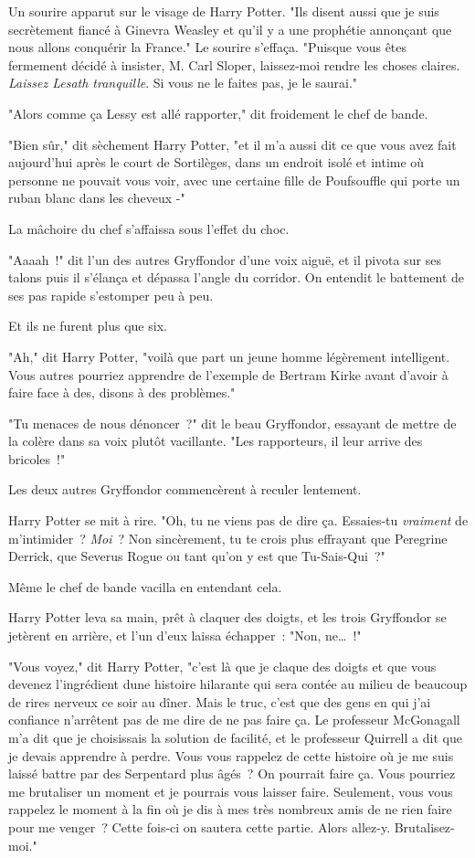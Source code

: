 Un sourire apparut sur le visage de Harry Potter. "Ils disent aussi que je suis secrètement fiancé à Ginevra Weasley et qu'il y a une prophétie annonçant que nous allons conquérir la France." Le sourire s'effaça. "Puisque vous êtes fermement décidé à insister, M. Carl Sloper, laissez-moi rendre les choses claires. \emph{Laissez Lesath tranquille}. Si vous ne le faites pas, je le saurai."

"Alors comme ça Lessy est allé rapporter," dit froidement le chef de bande.

"Bien sûr," dit sèchement Harry Potter, "et il m'a aussi dit ce que vous avez fait aujourd'hui après le court de Sortilèges, dans un endroit isolé et intime où personne ne pouvait vous voir, avec une certaine fille de Poufsouffle qui porte un ruban blanc dans les cheveux -"

La mâchoire du chef s'affaissa sous l'effet du choc.

"Aaaah~!" dit l'un des autres Gryffondor d'une voix aiguë, et il pivota sur ses talons puis il s'élança et dépassa l'angle du corridor. On entendit le battement de ses pas rapide s'estomper peu à peu.

Et ils ne furent plus que six.

"Ah," dit Harry Potter, "voilà que part un jeune homme légèrement intelligent. Vous autres pourriez apprendre de l'exemple de Bertram Kirke avant d'avoir à faire face à des, disons à des problèmes."

"Tu menaces de nous dénoncer~?" dit le beau Gryffondor, essayant de mettre de la colère dans sa voix plutôt vacillante. "Les rapporteurs, il leur arrive des bricoles~!"

Les deux autres Gryffondor commencèrent à reculer lentement.

Harry Potter se mit à rire. "Oh, tu ne viens pas de dire ça. Essaies-tu \emph{vraiment} de m'intimider~? \emph{Moi}~? Non sincèrement, tu te crois plus effrayant que Peregrine Derrick, que Severus Rogue ou tant qu'on y est que Tu-Sais-Qui~?"

Même le chef de bande vacilla en entendant cela.

Harry Potter leva sa main, prêt à claquer des doigts, et les trois Gryffondor se jetèrent en arrière, et l'un d'eux laissa échapper~: "Non, ne…~!"

"Vous voyez," dit Harry Potter, "c'est là que je claque des doigts et que vous devenez l'ingrédient dune histoire hilarante qui sera contée au milieu de beaucoup de rires nerveux ce soir au dîner. Mais le truc, c'est que des gens en qui j'ai confiance n'arrêtent pas de me dire de ne pas faire ça. Le professeur McGonagall m'a dit que je choisissais la solution de facilité, et le professeur Quirrell a dit que je devais apprendre à perdre. Vous vous rappelez de cette histoire où je me suis laissé battre par des Serpentard plus âgés~? On pourrait faire ça. Vous pourriez me brutaliser un moment et je pourrais vous laisser faire. Seulement, vous vous rappelez le moment à la fin où je dis à mes très nombreux amis de ne rien faire pour me venger~? Cette fois-ci on sautera cette partie. Alors allez-y. Brutalisez-moi."

